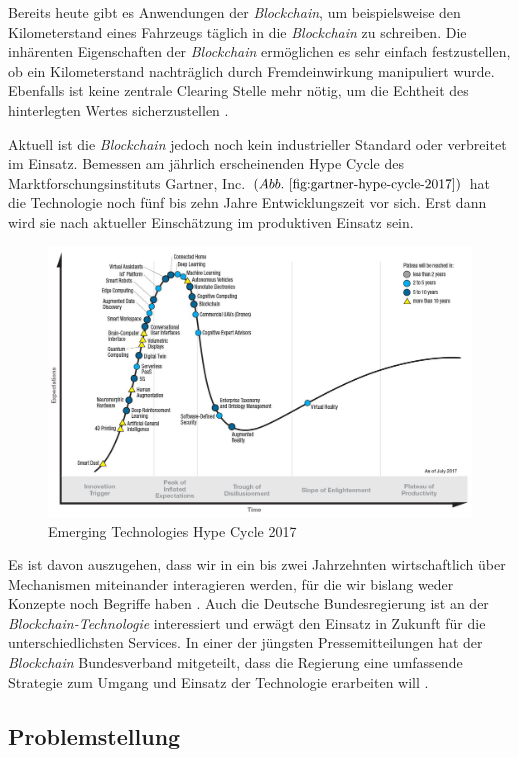 Bereits heute gibt es Anwendungen der \textit{Blockchain}, um beispielsweise den Kilometerstand eines Fahrzeugs täglich \glqq in die \textit{Blockchain}\grqq{} zu schreiben. Die inhärenten Eigenschaften der \textit{Blockchain} ermöglichen es sehr einfach festzustellen, ob ein Kilometerstand nachträglich durch Fremdeinwirkung manipuliert wurde. Ebenfalls ist keine zentrale \glqq Clearing Stelle\grqq{} mehr nötig, um die Echtheit des hinterlegten Wertes sicherzustellen \citep{carVertical}.

Aktuell ist die \textit{Blockchain} jedoch noch kein industrieller Standard oder verbreitet im Einsatz. Bemessen am jährlich erscheinenden Hype Cycle des Marktforschungsinstituts Gartner, Inc. $( Abb.~ \ref{fig:gartner-hype-cycle-2017} )$ hat die Technologie noch fünf bis zehn Jahre Entwicklungszeit vor sich. Erst dann wird sie nach aktueller Einschätzung im produktiven Einsatz sein.

\begin{figure}[H]
	\centering
	\includegraphics[width=0.7\linewidth]{pictures/Gartner-Hype-Cycle-2017}
	\caption[Gartner Hype Cycle 2017]{Emerging Technologies Hype Cycle 2017\citep{Gartner2017}}
	\label{fig:gartner-hype-cycle-2017}
\end{figure}

\glqq Es ist davon auszugehen, dass wir in ein bis zwei Jahrzehnten wirtschaftlich über Mechanismen miteinander interagieren werden, für die wir bislang weder Konzepte noch Begriffe haben\grqq{} \citep[S.~92]{Platzer2014}.
Auch die Deutsche Bundesregierung ist an der \textit{Blockchain-Technologie} interessiert und erwägt den Einsatz in Zukunft für die unterschiedlichsten Services. In einer der jüngsten Pressemitteilungen hat der \textit{Blockchain} Bundesverband mitgeteilt, dass die Regierung eine umfassende Strategie zum Umgang und Einsatz der Technologie erarbeiten will \citep{BCBundesverband2018}.

\subsection{Problemstellung} \label{Problemstellung}

